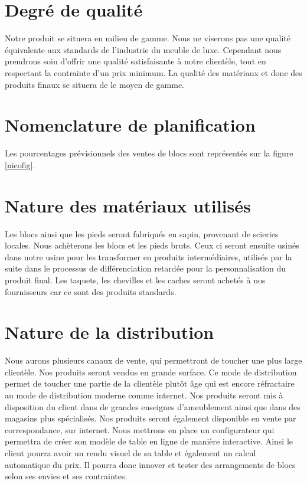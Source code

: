 \section{Degré de qualité}
Notre produit se situera en milieu de gamme. Nous ne viserons pas une qualité équivalente aux standards de l'industrie du meuble de luxe. Cependant nous prendrons soin d'offrir une qualité satisfaisante à notre clientèle, tout en respectant la contrainte d'un prix minimum. La qualité des matériaux et donc des produits finaux se situera de le moyen de gamme.

\section{Nomenclature de planification}
Les pourcentages prévisionnels des ventes de blocs sont représentés sur la figure \ref{nicofig}. 

\section{Nature des matériaux utilisés}
Les blocs ainsi que les pieds seront fabriqués en sapin, provenant de scieries locales. Nous achèterons les blocs et les pieds bruts. Ceux ci seront ensuite usinés dans notre usine pour les transformer en produits intermédiaires, utilisés par la suite dans le processus de différenciation retardée pour la personnalisation du produit final. 
Les taquets, les chevilles et les caches seront achetés à nos fournisseurs car ce sont des produits standards. 

\section{Nature de la distribution}
Nous aurons plusieurs canaux de vente, qui permettront de toucher une plus large clientèle.
Nos produits seront vendus en grande surface. Ce mode de distribution permet de toucher une partie de la clientèle plutôt âge qui est encore réfractaire au mode de distribution moderne comme internet. Nos produits seront mis à disposition du client dans de grandes enseignes d'ameublement ainsi que dans des magasins plus spécialisés. 
Nos produits seront également disponible en vente par correspondance, sur internet. Nous mettrons en place un configurateur qui permettra de créer son modèle de table en ligne de manière interactive. Ainsi le client pourra avoir un rendu visuel de sa table et également un calcul automatique du prix. Il pourra donc innover et tester des arrangements de blocs selon ses envies et ses contraintes. 

